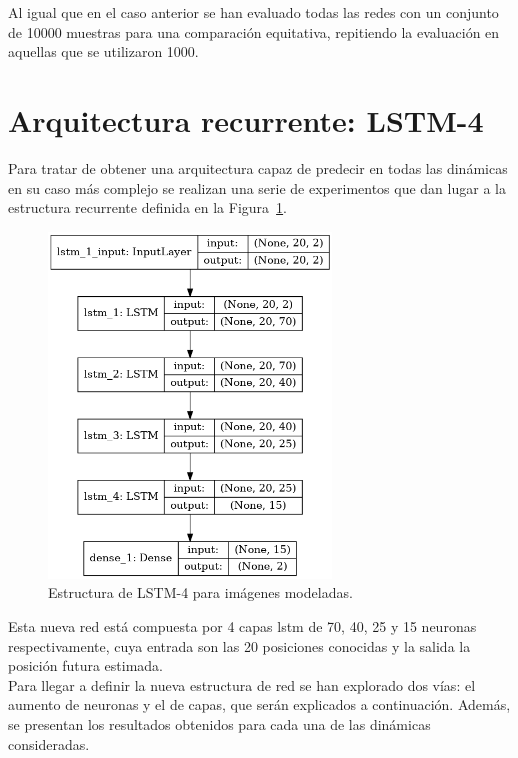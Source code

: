 Al igual que en el caso anterior se han evaluado todas las redes con un conjunto de 10000 muestras para una comparación equitativa, repitiendo la evaluación en aquellas que se utilizaron 1000.

\section{Arquitectura recurrente: LSTM-4}
Para tratar de obtener una arquitectura capaz de predecir en todas las dinámicas en su caso más complejo se realizan una serie de experimentos que dan lugar a la estructura recurrente definida en la Figura~\ref{fig.rec_complex_mod}.

\begin{figure}[H]
		\begin{center}
			\includegraphics[width=0.67\textwidth]{ figures/net/REC_complex_mod.png}
			\caption{Estructura de LSTM-4 para imágenes modeladas.}
			\label{fig.rec_complex_mod}
		\end{center}
\end{figure}
\vspace{-10pt}
Esta nueva red está compuesta por 4 capas \acrshort{lstm} de 70, 40, 25 y 15 neuronas respectivamente, cuya entrada son las 20 posiciones conocidas y la salida la posición futura estimada.\\
\indent Para llegar a definir la nueva estructura de red se han explorado dos vías: el aumento de neuronas y el de capas, que serán explicados a continuación. Además, se presentan los resultados obtenidos para cada una de las dinámicas consideradas.

